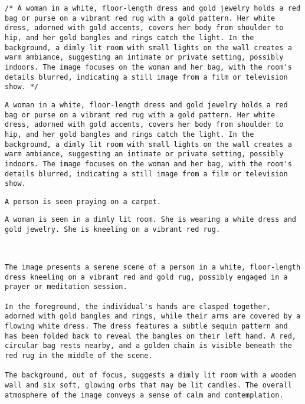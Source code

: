 \begin{lstlisting}[caption={Captions using Ensemble with Llama for 3773.jpg}]
/* A woman in a white, floor-length dress and gold jewelry holds a red bag or purse on a vibrant red rug with a gold pattern. Her white dress, adorned with gold accents, covers her body from shoulder to hip, and her gold bangles and rings catch the light. In the background, a dimly lit room with small lights on the wall creates a warm ambiance, suggesting an intimate or private setting, possibly indoors. The image focuses on the woman and her bag, with the room's details blurred, indicating a still image from a film or television show. */
\end{lstlisting}


\begin{lstlisting}[caption={Captions using Llama 3.2 for 3773.jpg}]
A woman in a white, floor-length dress and gold jewelry holds a red bag or purse on a vibrant red rug with a gold pattern. Her white dress, adorned with gold accents, covers her body from shoulder to hip, and her gold bangles and rings catch the light. In the background, a dimly lit room with small lights on the wall creates a warm ambiance, suggesting an intimate or private setting, possibly indoors. The image focuses on the woman and her bag, with the room's details blurred, indicating a still image from a film or television show.
\end{lstlisting}


\begin{lstlisting}[caption={Captions using Phi 4 for 3773.jpg}]
A person is seen praying on a carpet.
\end{lstlisting}


\begin{lstlisting}[caption={Captions using Phi 4 with SAM 2 for 3773.jpg}]
A woman is seen in a dimly lit room. She is wearing a white dress and gold jewelry. She is kneeling on a vibrant red rug.
\end{lstlisting}


\begin{lstlisting}[caption={Captions using Llama 3.2 with SAM 2 for 3773.jpg}]


The image presents a serene scene of a person in a white, floor-length dress kneeling on a vibrant red and gold rug, possibly engaged in a prayer or meditation session.

In the foreground, the individual's hands are clasped together, adorned with gold bangles and rings, while their arms are covered by a flowing white dress. The dress features a subtle sequin pattern and has been folded back to reveal the bangles on their left hand. A red, circular bag rests nearby, and a golden chain is visible beneath the red rug in the middle of the scene.

The background, out of focus, suggests a dimly lit room with a wooden wall and six soft, glowing orbs that may be lit candles. The overall atmosphere of the image conveys a sense of calm and contemplation.
\end{lstlisting}

